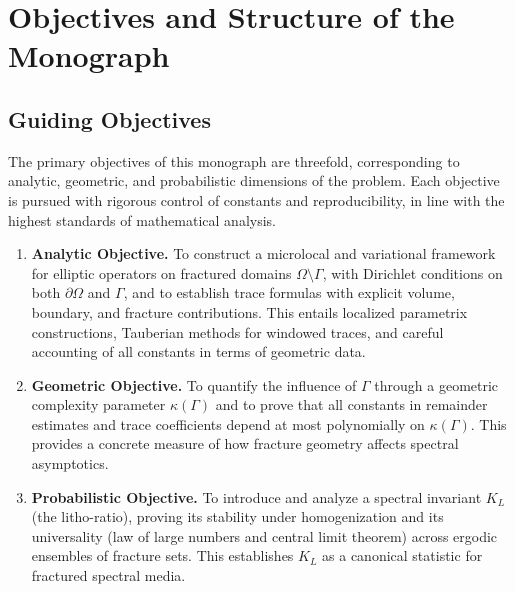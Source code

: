 
\section{Objectives and Structure of the Monograph}

\subsection*{Guiding Objectives}
The primary objectives of this monograph are threefold, corresponding to analytic,
geometric, and probabilistic dimensions of the problem. Each objective is pursued
with rigorous control of constants and reproducibility, in line with the highest
standards of mathematical analysis.

\begin{enumerate}[label=(O\arabic*)]
  \item \textbf{Analytic Objective.} To construct a microlocal and variational
  framework for elliptic operators on fractured domains $\Omega\setminus\Gamma$,
  with Dirichlet conditions on both $\partial\Omega$ and $\Gamma$, and to establish
  trace formulas with explicit volume, boundary, and fracture contributions. This
  entails localized parametrix constructions, Tauberian methods for windowed traces,
  and careful accounting of all constants in terms of geometric data.
  \item \textbf{Geometric Objective.} To quantify the influence of $\Gamma$ through
  a geometric complexity parameter $\kappa(\Gamma)$ and to prove that all constants
  in remainder estimates and trace coefficients depend at most polynomially on
  $\kappa(\Gamma)$. This provides a concrete measure of how fracture geometry
  affects spectral asymptotics.
  \item \textbf{Probabilistic Objective.} To introduce and analyze a spectral invariant
  $K_L$ (the litho-ratio), proving its stability under homogenization and its
  universality (law of large numbers and central limit theorem) across ergodic
  ensembles of fracture sets. This establishes $K_L$ as a canonical statistic for
  fractured spectral media.
\end{enumerate}

